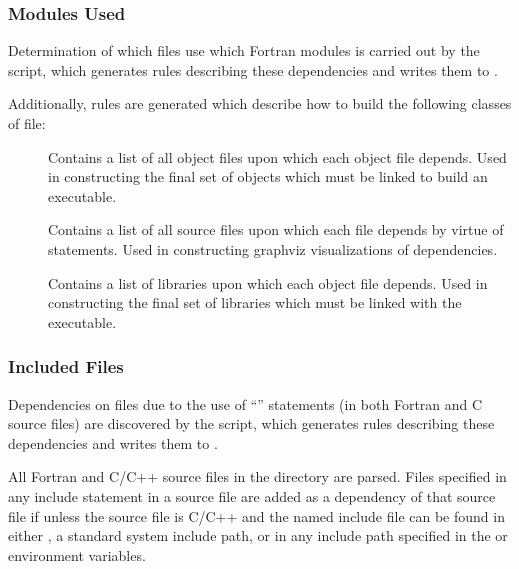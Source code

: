 \subsubsection{Modules Used}\label{sec:buildModulesUsed}

Determination of which files use which Fortran modules is carried out by the  script, which generates rules describing these dependencies and writes them to .

Additionally, rules are generated which describe how to build the following classes of file:
\begin{description}
\item[] Contains a list of all object files upon which each object file depends. Used in constructing the final set of objects which must be linked to build an executable.
\item[] Contains a list of all source files upon which each file depends by virtue of  statements. Used in constructing \gls{graphviz} visualizations of dependencies.
\item[] Contains a list of libraries upon which each object file depends. Used in constructing the final set of libraries which must be linked with the executable.
\end{description}

\subsubsection{Included Files}\label{sec:buildIncludeDeps}

Dependencies on files due to the use of ``'' statements (in both Fortran and C source files) are discovered by the  script, which generates rules describing these dependencies and writes them to .

All Fortran and C/C++ source files in the  directory are parsed. Files specified in any include statement in a source file are added as a dependency of that source file if unless the source file is C/C++ and the named include file can be found in either , a standard system include path, or in any include path specified in the  or  environment variables.

